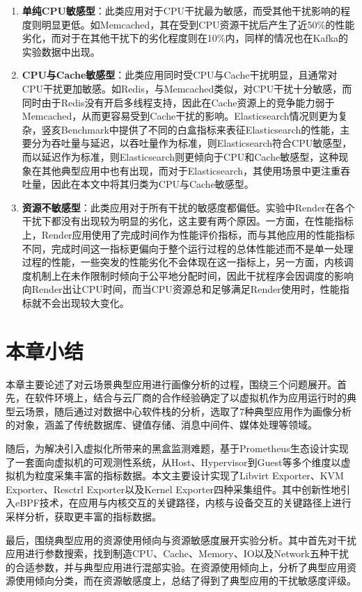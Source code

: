 \begin{enumerate}
    \item \textbf{单纯CPU敏感型}：此类应用对于CPU干扰最为敏感，而受其他干扰影响的程度则明显更低。如Memcached，其在受到CPU资源干扰后产生了近50\%的性能劣化，而对于在其他干扰下的劣化程度则在10\%内，同样的情况也在Kafka的实验数据中出现。
    \item \textbf{CPU与Cache敏感型}：此类应用同时受CPU与Cache干扰明显，且通常对CPU干扰更加敏感。如Redis，与Memcached类似，对CPU干扰十分敏感，而同时由于Redis没有开启多线程支持，因此在Cache资源上的竞争能力弱于Memcached，从而更容易受到Cache干扰的影响。Elasticsearch情况则更为复杂，竖亥Benchmark中提供了不同的白盒指标来表征Elasticsearch的性能，主要分为吞吐量与延迟，以吞吐量作为标准，则Elasticsearch符合CPU敏感型，而以延迟作为标准，则Elasticsearch则更倾向于CPU和Cache敏感型，这种现象在其他典型应用中也有出现，而对于Elasticsearch，其使用场景中更注重吞吐量，因此在本文中将其归类为CPU与Cache敏感型。
    \item \textbf{资源不敏感型}：此类应用对于所有干扰的敏感度都偏低。实验中Render在各个干扰下都没有出现较为明显的劣化，这主要有两个原因。一方面，在性能指标上，Render应用使用了完成时间作为性能评价指标，而与其他应用的性能指标不同，完成时间这一指标更偏向于整个运行过程的总体性能述而不是单一处理过程的性能，一些突发的性能劣化不会体现在这一指标上，另一方面，内核调度机制上在未作限制时倾向于公平地分配时间，因此干扰程序会因调度的影响向Render出让CPU时间，而当CPU资源总和足够满足Render使用时，性能指标就不会出现较大变化。
\end{enumerate}

\section{本章小结}

本章主要论述了对云场景典型应用进行画像分析的过程，围绕三个问题展开。首先，在软件环境上，结合与云厂商的合作经验确定了以虚拟机作为应用运行时的典型云场景，随后通过对数据中心软件栈的分析，选取了7种典型应用作为画像分析的对象，涵盖了传统数据库、键值存储、消息中间件、媒体处理等领域。

随后，为解决引入虚拟化所带来的黑盒监测难题，基于Prometheus生态设计实现了一套面向虚拟机的可观测性系统，从Host、Hypervisor到Guest等多个维度以虚拟机为粒度采集丰富的指标数据。本文主要设计实现了Libvirt Exporter、KVM Exporter、Resctrl Exporter以及Kernel Exporter四种采集组件。其中创新性地引入eBPF技术，在应用与内核交互的关键路径，内核与设备交互的关键路径上进行采样分析，获取更丰富的指标数据。

最后，围绕典型应用的资源使用倾向与资源敏感度展开实验分析。其中首先对干扰应用进行参数搜索，找到制造CPU、Cache、Memory、IO以及Network五种干扰的合适参数，并与典型应用进行混部实验。在资源使用倾向上，分析了典型应用资源使用倾向分类，而在资源敏感度上，总结了得到了典型应用的干扰敏感度评级。